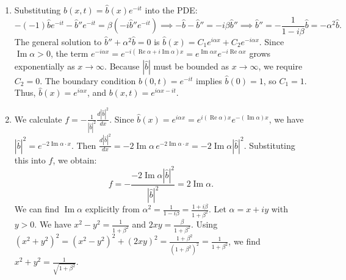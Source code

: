 \documentclass{article}
\begin{document}
\begin{enumerate}[label=\fbox{\arabic*}]
\begin{enumerate}[label=(\arabic*)]
\[          \]
          The $y$-component yields $\partial_t v = -\partial_y \left( p + \frac{1+b^2}{2} \right) + \partial_x b$. Assuming $p = p(x,t)$, the $y$-derivative of pressure vanishes, yielding $\partial_t v = \partial_x b$.
          To eliminate $v$, we take the time derivative of the induction equation and substitute $\partial_t v = \partial_x b$:
          \[
            \partial_{tt} b - \partial_x (\partial_t v) = \beta \partial_{xxt} b \implies \partial_{tt} b - \partial_{xx} b = \beta \partial_{xxt} b.
          \]
          This is the partial differential equation for $b(x, t)$.
          \item Substituting $b(x,t) = \hat{b}(x)e^{-it}$ into the PDE:
          \[
            -(-1)\hat{b} e^{-it} - \hat{b}'' e^{-it} = \beta(-i \hat{b}'' e^{-it}) \implies -\hat{b} - \hat{b}'' = -i\beta \hat{b}'' \implies \hat{b}'' = -\frac{1}{1 - i\beta} \hat{b} = -\alpha^2 \hat{b}.
          \]
          The general solution to $\hat{b}'' + \alpha^2 \hat{b} = 0$ is $\hat{b}(x) = C_1 e^{i\alpha x} + C_2 e^{-i\alpha x}$.
          Since $\operatorname{Im} \alpha > 0$, the term $e^{-i\alpha x} = e^{-i(\operatorname{Re}\alpha + i\operatorname{Im}\alpha)x} = e^{\operatorname{Im}\alpha x} e^{-i\operatorname{Re}\alpha x}$ grows exponentially as $x \to \infty$. 
          Because $|\hat{b}|$ must be bounded as $x \to \infty$, we require $C_2 = 0$. 
          The boundary condition $b(0, t) = e^{-it}$ implies $\hat{b}(0) = 1$, so $C_1 = 1$.
          Thus, $\hat{b}(x) = e^{i\alpha x}$, and $b(x, t) = e^{i\alpha x - it}$.
          \item We calculate $f = -\frac{1}{|\hat{b}|^2} \frac{d|\hat{b}|^2}{dx}$.
          Since $\hat{b}(x) = e^{i\alpha x} = e^{i(\operatorname{Re}\alpha)x} e^{-(\operatorname{Im}\alpha)x}$, we have $|\hat{b}|^2 = e^{-2\operatorname{Im}\alpha \cdot x}$.
          Then $\frac{d|\hat{b}|^2}{dx} = -2\operatorname{Im}\alpha \, e^{-2\operatorname{Im}\alpha \cdot x} = -2\operatorname{Im}\alpha |\hat{b}|^2$.
          Substituting this into $f$, we obtain:
          \[
            f = -\frac{-2\operatorname{Im}\alpha |\hat{b}|^2}{|\hat{b}|^2} = 2\operatorname{Im}\alpha.
          \]
          We can find $\operatorname{Im}\alpha$ explicitly from $\alpha^2 = \frac{1}{1-i\beta} = \frac{1+i\beta}{1+\beta^2}$.
          Let $\alpha = x + iy$ with $y > 0$. We have $x^2 - y^2 = \frac{1}{1+\beta^2}$ and $2xy = \frac{\beta}{1+\beta^2}$.
          Using $(x^2+y^2)^2 = (x^2-y^2)^2 + (2xy)^2 = \frac{1+\beta^2}{(1+\beta^2)^2} = \frac{1}{1+\beta^2}$, we find $x^2+y^2 = \frac{1}{\sqrt{1+\beta^2}}$.

\end{enumerate}
\end{enumerate}
\end{document}
